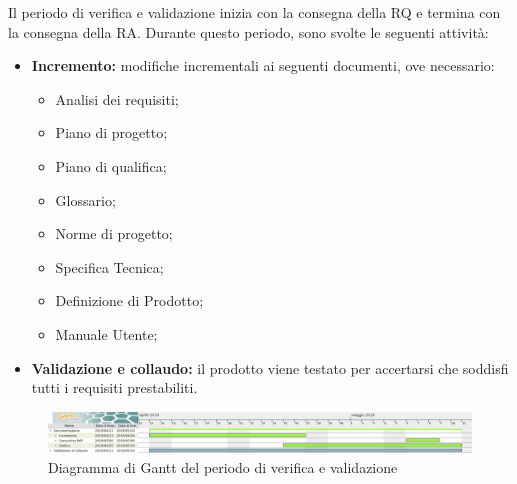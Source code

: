 Il periodo di verifica e validazione inizia con la consegna della RQ e termina con la consegna della RA.\newline
Durante questo periodo, sono svolte le seguenti attività:
\begin{itemize}
	\item \textbf{Incremento: }modifiche incrementali ai seguenti documenti, ove necessario:
	\begin{itemize}
		\item Analisi dei requisiti;
		\item Piano di progetto;
		\item Piano di qualifica;
		\item Glossario;
		\item Norme di progetto;
		\item Specifica Tecnica;
		\item Definizione di Prodotto;
		\item Manuale Utente;
	\end{itemize}
	\item \textbf{Validazione e collaudo: }il prodotto viene testato per accertarsi che soddisfi tutti i requisiti prestabiliti.
\end{itemize}


\begin{figure}[H]
	\includegraphics[width=1\linewidth]{Pianificazione/Verifica_Validazione.png}
	\caption{Diagramma di Gantt del periodo di verifica e validazione}
\end{figure}